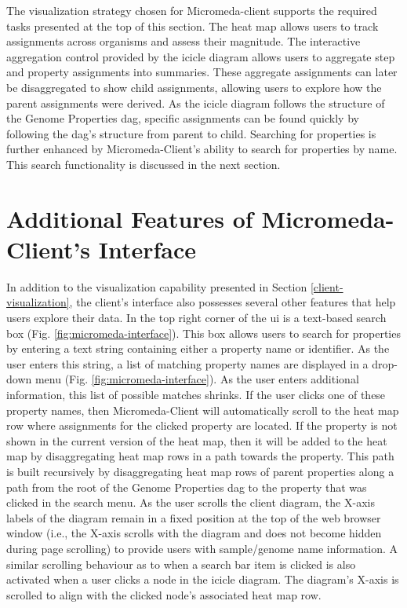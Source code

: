 The visualization strategy chosen for Micromeda-client supports the required 
tasks presented at the top of this section. The heat map allows users to track 
assignments across organisms and assess their magnitude. The interactive 
aggregation control provided by the icicle diagram allows users to aggregate 
step and property assignments into summaries. These aggregate assignments can 
later be disaggregated to show child assignments, allowing users to explore how 
the parent assignments were derived. As the icicle diagram follows the structure 
of the Genome Properties \gls{dag}, specific assignments can be found quickly by 
following the \gls{dag}'s structure from parent to child. Searching for 
properties is further enhanced by Micromeda-Client's ability to search for 
properties by name. This search functionality is discussed in the next section.

\section{Additional Features of Micromeda-Client's Interface} 
\label{client-additional-features}

In addition to the visualization capability presented in Section 
\ref{client-visualization}, the client's interface also possesses several other 
features that help users explore their data. In the top right corner of the 
\gls{ui} is a text-based search box (Fig. \ref{fig:micromeda-interface}). This 
box allows users to search for properties by entering a text string containing 
either a property name or identifier. As the user enters this string, a list of 
matching property names are displayed in a drop-down menu (Fig. 
\ref{fig:micromeda-interface}). As the user enters additional information, this 
list of possible matches shrinks. If the user clicks one of these property 
names, then Micromeda-Client will automatically scroll to the heat map row where 
assignments for the clicked property are located. If the property is not shown 
in the current version of the heat map, then it will be added to the heat map by 
disaggregating heat map rows in a path towards the property. This path is built 
recursively by disaggregating heat map rows of parent properties along a path 
from the root of the Genome Properties \gls{dag} to the property that was 
clicked in the search menu. As the user scrolls the client diagram, the X-axis 
labels of the diagram remain in a fixed position at the top of the web browser 
window (i.e., the X-axis scrolls with the diagram and does not become hidden 
during page scrolling) to provide users with sample/genome name information. A 
similar scrolling behaviour as to when a search bar item is clicked is also 
activated when a user clicks a node in the icicle diagram. The diagram's X-axis 
is scrolled to align with the clicked node's associated heat map row.

